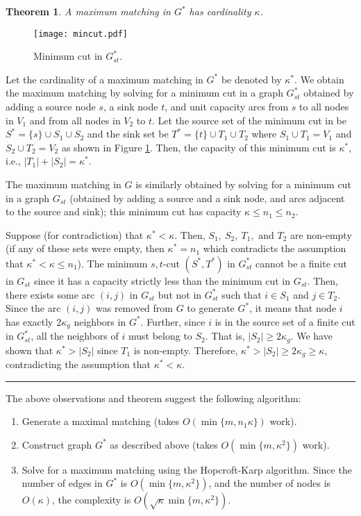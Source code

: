 \documentclass{article}
\newtheorem{theorem}{Theorem}[section]
\newenvironment{proof}[1][Proof:]{\begin{trivlist}
\item[\hskip \labelsep {\bfseries #1}]}{\end{trivlist}}
\newcommand{\qed}{\hfill \rule{2.5mm}{2.5mm}}
\begin{document}
\begin{theorem}
\label{theorem:altGraphMatching}
A maximum matching in $G^*$ has cardinality $\kappa$.
\end{theorem}
\begin{proof}

\begin{figure}[ht]
\centerline{\texttt{[image: mincut.pdf]}}
\caption{\label{fig:mincut}Minimum cut in $G^*_{st}$.}
\end{figure}

Let the cardinality of a maximum matching in $G^*$ be denoted by $\kappa^*$. We obtain the maximum matching by solving for a minimum cut in a graph $G^*_{st}$ obtained by adding a source node $s$, a sink node $t$, and unit capacity arcs from $s$ to all nodes in $V_1$ and from all nodes in $V_2$ to $t$. Let the source set of the minimum cut in be $S^* = \{s\} \cup S_1 \cup S_2$ and the sink set be $T^* = \{t\} \cup T_1 \cup T_2$ where $S_1 \cup T_1 = V_1$ and $S_2 \cup T_2 = V_2$ as shown in Figure \ref{fig:mincut}. Then, the capacity of this minimum cut is $\kappa^*$, i.e., $|T_1| + |S_2| = \kappa^*$.

The maximum matching in $G$ is similarly obtained by solving for a minimum cut in a graph $G_{st}$ (obtained by adding a source and a sink node, and arcs adjacent to the source and sink); this minimum cut has capacity $\kappa \leq n_1 \leq n_2$.

Suppose (for contradiction) that $\kappa^* < \kappa$. Then, $S_1,\ S_2,\ T_1, \mbox{ and } T_2$ are non-empty (if any of these sets were empty, then  $\kappa^* = n_1$ which contradicts the assumption that $\kappa^* < \kappa \leq n_1$). The minimum $s,t$-cut $(S^*, T^*)$ in $G^*_{st}$ cannot be a finite cut in $G_{st}$ since it has a capacity strictly less than the minimum cut in $G_{st}$. Then, there exists some arc $(i,j)$ in $G_{st}$ but not in $G^*_{st}$ such that $i \in S_1$ and $j \in T_2$. Since the arc $(i,j)$ was removed from $G$ to generate $G^*$, it means that node $i$ has exactly $2 \kappa_g$ neighbors in $G^*$.  Further, since $i$ is in the source set of a finite cut in $G^*_{st}$, all the neighbors of $i$ must belong to $S_2$. That is, $|S_2| \geq 2 \kappa_g$. We have shown that $\kappa^* > |S_2|$ since $T_1$ is non-empty. Therefore, $\kappa^* > |S_2| \geq 2 \kappa_g \geq \kappa$, contradicting the assumption that $\kappa^* < \kappa$.  \qed
\end{proof}

The above observations and theorem suggest the following algorithm:
\begin{enumerate}
\item Generate a maximal matching (takes $O(\min\{m, n_1 \kappa\})$ work).
\item Construct graph $G^*$ as described above (takes $O(\min\{m, \kappa^2\})$ work).
\item Solve for a maximum matching using the Hopcroft-Karp algorithm. Since the number of edges in $G^*$ is $O(\min\{m, \kappa^2\})$, and the number of nodes is $O(\kappa)$, the complexity is $O(\sqrt{\kappa} \min\{m, \kappa^2\})$.
\end{enumerate}
\end{document}
